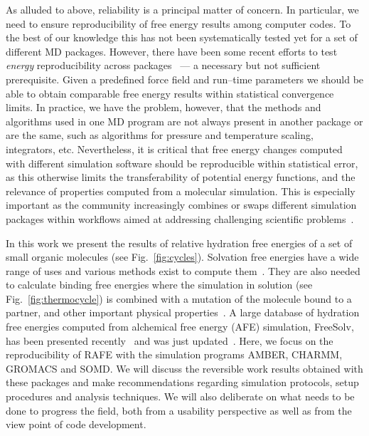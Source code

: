 \documentclass[journal=jctcce,manuscript=article]{achemso}
\begin{document}
As alluded to above, reliability is a principal matter of concern.  In
particular, we need to ensure reproducibility of free energy results
among computer codes.  To the best of our knowledge this has not been
systematically tested yet for a set of different MD packages. 
However, there have been some recent efforts to test \emph{energy} 
reproducibility across packages~\cite{Shirts2017} --- a necessary but not 
sufficient prerequisite.  Given a
predefined force field and run--time parameters we should be able to
obtain comparable free energy results within statistical convergence
limits.  
In practice, we have the problem, however, that the methods
and algorithms used in one MD program are not always present in another
package or are the same, such as algorithms for pressure and temperature 
scaling, integrators, etc.  Nevertheless, it is critical that free energy 
changes computed with different simulation software should be reproducible 
within statistical error, as this otherwise limits the transferability of 
potential energy functions, and the relevance of properties computed from a 
molecular simulation.  This is especially important as the community  
increasingly combines or swaps different simulation packages within workflows 
aimed at addressing challenging scientific 
problems~\cite{Pronk:2011:CNP:2063384.2063465, doi:10.1021/ci8000937, 
doi:10.1021/jp505332p, loeffler_fesetup:_2015, 
DBLP:journals/corr/Balasubramanian16g}.

In this work we present the results of relative hydration free
energies of a set of small organic molecules (see
Fig.~\ref{fig:cycles}).  Solvation free energies have a wide range of
uses and various methods exist to compute
them~\cite{Skyner:2015:PCCP}.  They are also needed to calculate
binding free energies where the simulation in solution (see
Fig.~\ref{fig:thermocycle}) is combined with a mutation of the
molecule bound to a partner, and other important physical
properties~\cite{Skyner:2015:PCCP}.  A large database of hydration
free energies computed from alchemical free energy (AFE) simulation, FreeSolv, 
has been presented recently~\cite{Mobley2014} and was just 
updated~\cite{doi:10.1021/acs.jced.7b00104}. Here, we focus on the 
reproducibility of RAFE with the simulation programs AMBER, CHARMM,
GROMACS and SOMD.  We will discuss the reversible work results
obtained with these packages and make recommendations
regarding simulation protocols, setup procedures and analysis
techniques.  We will also deliberate on what needs to be done to progress the 
field, both from a usability perspective as well as from the view point of code 
development.
\end{document}
